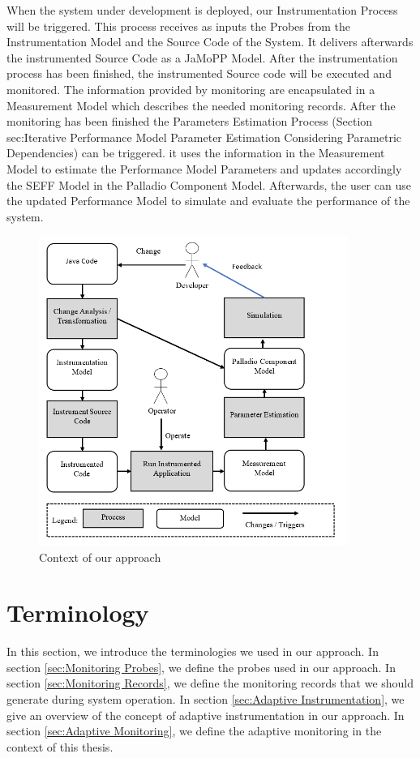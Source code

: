 When the system under development is deployed, our Instrumentation Process will be triggered. This process receives as inputs the Probes from the Instrumentation Model and the Source Code of the System. It delivers afterwards the instrumented Source Code as a JaMoPP Model. After the instrumentation process has been finished, the instrumented Source code will be executed and monitored.  The information provided by monitoring are encapsulated in a Measurement Model which describes the needed monitoring records.  After the monitoring has been finished the Parameters Estimation Process (Section sec:Iterative Performance Model Parameter Estimation Considering Parametric Dependencies) can be triggered. it uses the information in the Measurement Model to estimate the Performance Model Parameters and updates accordingly the SEFF Model in the Palladio Component Model. Afterwards, the user can use the updated Performance Model to simulate and evaluate the performance of the system. 


\begin{figure}[h]
\centering
\includegraphics[width=0.9\textwidth]{figures/approach_context}
\caption{Context of our approach}
\label{fig:Context of our approach}
\end{figure}

\section{Terminology}
\label{sec:Terminology}
In this section, we introduce the terminologies we used in our approach. In section \ref{sec:Monitoring Probes}, we define the probes used in our approach. In section \ref{sec:Monitoring Records}, we define the monitoring records that we should generate during system operation. In section \ref{sec:Adaptive Instrumentation}, we give an overview of the concept of adaptive instrumentation in our approach. In section \ref{sec:Adaptive Monitoring}, we define the adaptive monitoring in the context of this thesis.

